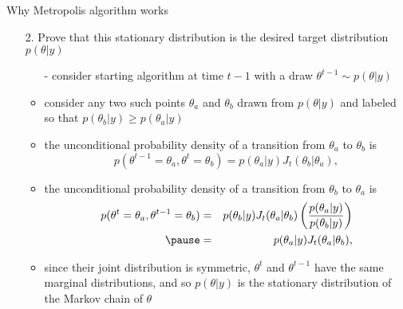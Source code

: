 \documentclass[finnish,english,t]{beamer}
\begin{document}
\begin{frame}{Why Metropolis algorithm works}

  \begin{itemize}
  \item[2.] Prove that this stationary distribution is the desired target distribution $p(\theta|y)$
    \begin{itemize}
    \item[-] consider starting algorithm at time $t-1$ with a draw
      $\theta^{t-1} \sim p(\theta|y)$ 
    \item<2->[-] consider any two such points $\theta_a$ and $\theta_b$ drawn
      from $p(\theta|y)$ and labeled so that
      $p(\theta_b|y)\geq p(\theta_a|y)$
    \item<3->[-] the unconditional probability density of a transition from $\theta_a$ to $\theta_b$ is
      \vspace{-0.5\baselineskip}
      \begin{equation*}
        p(\theta^{t-1}=\theta_a,\theta^{t}=\theta_b)=
        p(\theta_a|y)J_t(\theta_b|\theta_a),
      \end{equation*}
      \vspace{-1\baselineskip}
    \item<4->[-] the unconditional probability density of a transition from $\theta_b$ to $\theta_a$ is
      \vspace{-0.5\baselineskip}
      \begin{eqnarray*}
        p(\theta^{t}=\theta_a,\theta^{t-1}=\theta_b) & = &
        p(\theta_b|y)J_t(\theta_a|\theta_b)\left(\frac{p(\theta_a|y)}{p(\theta_b|y)}\right)\\
        \pause &  = &  p(\theta_a|y)J_t(\theta_a|\theta_b),
      \end{eqnarray*}
      \pause
    \item<6->[-] since their joint distribution is symmetric, $\theta^t$ and
      $\theta^{t-1}$ have the same marginal distributions, and so
      $p(\theta|y)$ is the stationary distribution of the Markov chain of $\theta$
    \end{itemize}
  \end{itemize}

\end{frame}
\end{document}

